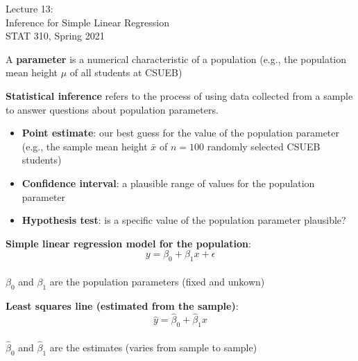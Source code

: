 \documentclass[11pt]{beamer}\usepackage[]{graphicx}\usepackage[]{color}
\begin{document}
\begin{frame}
\large
Lecture 13:\\
Inference for Simple Linear Regression\\
STAT 310, Spring 2021
\end{frame}

\begin{frame}
A \textbf{parameter} is a numerical characteristic of a population (e.g., the population mean height $\mu$ of all students at CSUEB)\\
\vspace{15pt}

\textbf{Statistical inference} refers to the process of using data collected from a sample to answer questions about population parameters.
\vspace{2pt}
\begin{itemize}
\item \textbf{Point estimate}: our best guess for the value of the population parameter (e.g., the sample mean height $\bar{x}$ of $n=100$ randomly selected CSUEB students)
\vspace{5pt}
\item \textbf{Confidence interval}: a plausible range of values for the population parameter
\vspace{5pt}
\item \textbf{Hypothesis test}: is a specific value of the population parameter plausible?
\end{itemize}
\end{frame}

\begin{frame}
\textbf{Simple linear regression model for the population}:\\
$$ y = \beta_0 + \beta_1 x + \epsilon $$\\
$\beta_0$ and $\beta_1$ are the population parameters (fixed and unkown)\\
\vspace{30pt}

\textbf{Least squares line (estimated from the sample)}:\\
$$ \hat{y} = \hat{\beta}_0 + \hat{\beta}_1 x $$\\
$\hat{\beta}_0$ and $\hat{\beta}_1$ are the estimates (varies from sample to sample)\\
\end{frame}

\begin{frame}
\end{frame}
\end{document}
